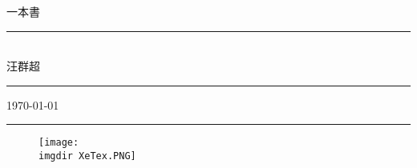   									
\usepackage{wallpaper} %
\makeindex 						

\fontsize{36}{30pt}\selectfont
\thispagestyle{empty}
\begin{flushright}
    {\MB \XeLaTeX 一本書}\\
    \rule{3in}{0.2pt}\\
    \medskip\hfill \Large {\SM 汪群超}\rule{8mm}{0pt}
    \medskip \par\vspace*{-2pt}\hfill \small\today\rule{8mm}{0pt}
\end{flushright}
\bigskip\bigskip\bigskip\bigskip
\begin{figure}[h]
    \centering
        \texttt{[image: \\imgdir XeTex.PNG]}%
    \end{figure}
    
\begin{figure}[H]
    \centering
        \hspace{1.4cm}
\end{figure}
    
\fontsize{12}{22pt}\selectfont

\newpage
\cleardoublepage
\setcounter{tocdepth}{2} %

\tableofcontents
\newpage
\renewcommand{\numberline}[1]{\loflabel~#1\hspace*{1em}}%
\listoffigures %
\newpage
\renewcommand{\numberline}[1]{\lotlabel~#1\hspace*{1em}}%
\listoftables %
\newpage
\ifodd{} \else \thispagestyle{empty}\mbox{}\clearpage\fi %
\setcounter{page}{1} 		%





%
%

%
%
%   

  



\printindex 						%
